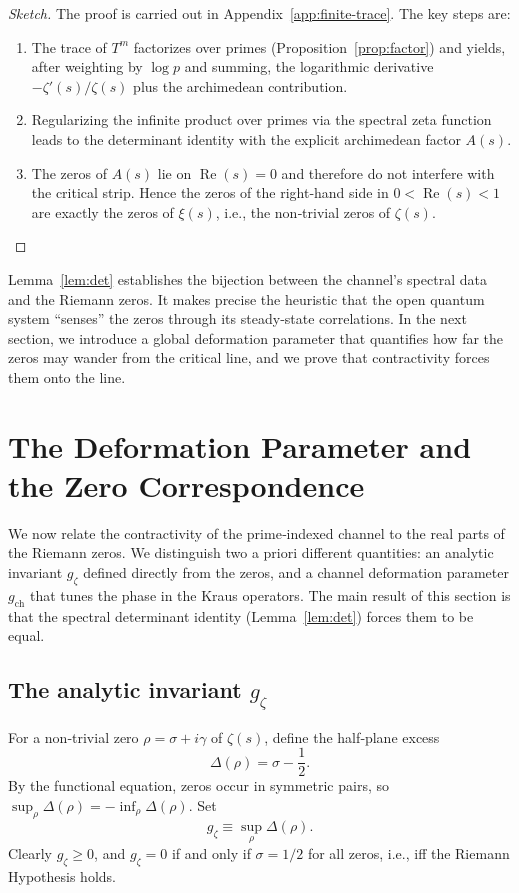 \documentclass[11pt,a4paper]{article}
\begin{document}
\begin{proof}[Sketch]
The proof is carried out in Appendix~\ref{app:finite-trace}.  The key steps are:
\begin{enumerate}
\item The trace of $T^m$ factorizes over primes (Proposition~\ref{prop:factor}) and yields, after weighting by $\log p$ and summing, the logarithmic derivative $-\zeta'(s)/\zeta(s)$ plus the archimedean contribution.
\item Regularizing the infinite product over primes via the spectral zeta function leads to the determinant identity with the explicit archimedean factor $A(s)$.
\item The zeros of $A(s)$ lie on $\operatorname{Re}(s)=0$ and therefore do not interfere with the critical strip.  Hence the zeros of the right‑hand side in $0<\operatorname{Re}(s)<1$ are exactly the zeros of $\xi(s)$, i.e., the non‑trivial zeros of $\zeta(s)$.
\end{enumerate}
\end{proof}

Lemma~\ref{lem:det} establishes the bijection between the channel's spectral data and the Riemann zeros.  It makes precise the heuristic that the open quantum system ``senses'' the zeros through its steady‑state correlations.  In the next section, we introduce a global deformation parameter that quantifies how far the zeros may wander from the critical line, and we prove that contractivity forces them onto the line.

\section{The Deformation Parameter and the Zero Correspondence}
\label{sec:g}

We now relate the contractivity of the prime‑indexed channel to the real parts of the Riemann zeros.  We distinguish two a priori different quantities: an analytic invariant $g_{\zeta}$ defined directly from the zeros, and a channel deformation parameter $g_{\mathrm{ch}}$ that tunes the phase in the Kraus operators.  The main result of this section is that the spectral determinant identity (Lemma~\ref{lem:det}) forces them to be equal.

\subsection{The analytic invariant $g_{\zeta}$}
\label{sec:gz}

For a non‑trivial zero $\rho = \sigma + i\gamma$ of $\zeta(s)$, define the half‑plane excess
\[
\Delta(\rho) = \sigma - \frac12 .
\]
By the functional equation, zeros occur in symmetric pairs, so $\sup_\rho \Delta(\rho) = -\inf_\rho \Delta(\rho)$.  Set
\begin{equation}\label{eq:gz-def}
g_{\zeta} \equiv \sup_{\rho} \Delta(\rho) .
\end{equation}
Clearly $g_{\zeta} \ge 0$, and $g_{\zeta}=0$ if and only if $\sigma=1/2$ for all zeros, i.e., iff the Riemann Hypothesis holds.
\end{document}
